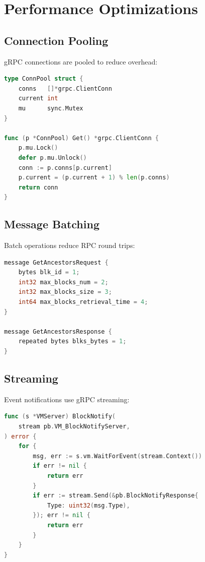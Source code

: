 \documentclass[11pt,letterpaper]{article}
\begin{document}
\section{Performance Optimizations}

\subsection{Connection Pooling}

gRPC connections are pooled to reduce overhead:

\begin{lstlisting}[language=Go, caption=Connection Pool]
type ConnPool struct {
    conns   []*grpc.ClientConn
    current int
    mu      sync.Mutex
}

func (p *ConnPool) Get() *grpc.ClientConn {
    p.mu.Lock()
    defer p.mu.Unlock()
    conn := p.conns[p.current]
    p.current = (p.current + 1) % len(p.conns)
    return conn
}
\end{lstlisting}

\subsection{Message Batching}

Batch operations reduce RPC round trips:

\begin{lstlisting}[language=Go, caption=Batched Block Request]
message GetAncestorsRequest {
    bytes blk_id = 1;
    int32 max_blocks_num = 2;
    int32 max_blocks_size = 3;
    int64 max_blocks_retrieval_time = 4;
}

message GetAncestorsResponse {
    repeated bytes blks_bytes = 1;
}
\end{lstlisting}

\subsection{Streaming}

Event notifications use gRPC streaming:

\begin{lstlisting}[language=Go, caption=Block Event Streaming]
func (s *VMServer) BlockNotify(
    stream pb.VM_BlockNotifyServer,
) error {
    for {
        msg, err := s.vm.WaitForEvent(stream.Context())
        if err != nil {
            return err
        }
        if err := stream.Send(&pb.BlockNotifyResponse{
            Type: uint32(msg.Type),
        }); err != nil {
            return err
        }
    }
}
\end{lstlisting}
\end{document}
